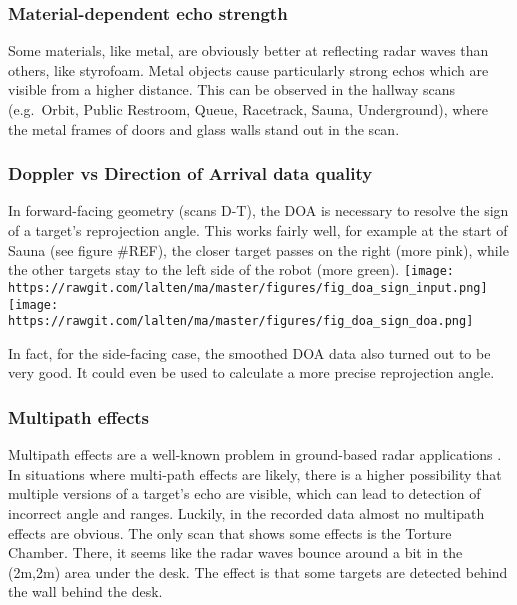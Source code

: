 \subsubsection{Material-dependent echo
strength}\label{material-dependent-echo-strength}

Some materials, like metal, are obviously better at reflecting radar
waves than others, like styrofoam. Metal objects cause particularly
strong echos which are visible from a higher distance. This can be
observed in the hallway scans (e.g.~Orbit, Public Restroom, Queue,
Racetrack, Sauna, Underground), where the metal frames of doors and
glass walls stand out in the scan.

\subsubsection{Doppler vs Direction of Arrival data
quality}\label{doppler-vs-direction-of-arrival-data-quality}

In forward-facing geometry (scans D-T), the DOA is necessary to resolve
the sign of a target's reprojection angle. This works fairly well, for
example at the start of Sauna (see figure \#REF), the closer target
passes on the right (more pink), while the other targets stay to the
left side of the robot (more green).
\texttt{[image: https://rawgit.com/lalten/ma/master/figures/fig\_doa\_sign\_input.png]}
\texttt{[image: https://rawgit.com/lalten/ma/master/figures/fig\_doa\_sign\_doa.png]}

In fact, for the side-facing case, the smoothed DOA data also turned out
to be very good. It could even be used to calculate a more precise
reprojection angle.

\subsubsection{Multipath effects}\label{multipath-effects}

Multipath effects are a well-known problem in ground-based radar
applications \cite{Adams2012}. In situations where multi-path effects
are likely, there is a higher possibility that multiple versions of a
target's echo are visible, which can lead to detection of incorrect
angle and ranges. Luckily, in the recorded data almost no multipath
effects are obvious. The only scan that shows some effects is the
Torture Chamber. There, it seems like the radar waves bounce around a
bit in the (2m,2m) area under the desk. The effect is that some targets
are detected behind the wall behind the desk.

